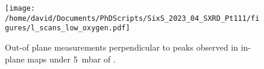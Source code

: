 
\begin{figure}[!htb]
    \centering
    \texttt{[image: /home/david/Documents/PhDScripts/SixS\_2023\_04\_SXRD\_Pt111/figures/l\_scans\_low\_oxygen.pdf]}
    \caption{
        Out-of plane measurements perpendicular to peaks observed in in-plane maps under \qty{5}{\milli\bar} of \dioxygen.
    }
    \label{fig:LScans05}
\end{figure}

